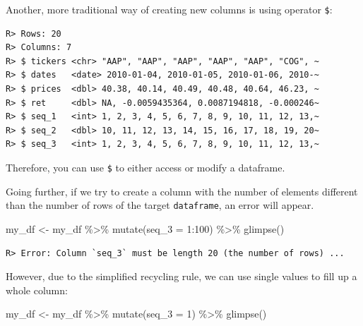 \documentclass[
  12pt,
]{book}
\newenvironment{Shaded}{\begin{snugshade}}{\end{snugshade}}
\newcommand{\AttributeTok}[1]{\textcolor[rgb]{0.61,0.61,0.61}{#1}}
\newcommand{\CommentTok}[1]{\textcolor[rgb]{0.37,0.37,0.37}{\textit{#1}}}
\newcommand{\DecValTok}[1]{\textcolor[rgb]{0.06,0.06,0.06}{#1}}
\newcommand{\FunctionTok}[1]{\textcolor[rgb]{0,0,0}{#1}}
\newcommand{\NormalTok}[1]{#1}
\newcommand{\OtherTok}[1]{\textcolor[rgb]{0.37,0.37,0.37}{#1}}
\newcommand{\SpecialCharTok}[1]{\textcolor[rgb]{0,0,0}{#1}}
\begin{document}
Another, more traditional way of creating new columns is using operator \texttt{\$}:

\begin{Shaded}
\end{Shaded}

\begin{verbatim}
R> Rows: 20
R> Columns: 7
R> $ tickers <chr> "AAP", "AAP", "AAP", "AAP", "AAP", "COG", ~
R> $ dates   <date> 2010-01-04, 2010-01-05, 2010-01-06, 2010-~
R> $ prices  <dbl> 40.38, 40.14, 40.49, 40.48, 40.64, 46.23, ~
R> $ ret     <dbl> NA, -0.0059435364, 0.0087194818, -0.000246~
R> $ seq_1   <int> 1, 2, 3, 4, 5, 6, 7, 8, 9, 10, 11, 12, 13,~
R> $ seq_2   <dbl> 10, 11, 12, 13, 14, 15, 16, 17, 18, 19, 20~
R> $ seq_3   <int> 1, 2, 3, 4, 5, 6, 7, 8, 9, 10, 11, 12, 13,~
\end{verbatim}

Therefore, you can use \texttt{\$} to either access or modify a dataframe.

Going further, if we try to create a column with the number of elements different than the number of rows of the target \texttt{dataframe}, an error will appear.

\begin{Shaded}
\begin{Highlighting}[]
\NormalTok{my\_df }\OtherTok{\textless{}{-}}\NormalTok{ my\_df }\SpecialCharTok{\%\textgreater{}\%}
  \FunctionTok{mutate}\NormalTok{(}\AttributeTok{seq\_3 =}  \DecValTok{1}\SpecialCharTok{:}\DecValTok{100}\NormalTok{) }\SpecialCharTok{\%\textgreater{}\%}
  \FunctionTok{glimpse}\NormalTok{()}
\end{Highlighting}
\end{Shaded}

\begin{verbatim}
R> Error: Column `seq_3` must be length 20 (the number of rows) ...
\end{verbatim}

However, due to the simplified recycling rule, we can use single values to fill up a whole column:

\begin{Shaded}
\begin{Highlighting}[]
\NormalTok{my\_df }\OtherTok{\textless{}{-}}\NormalTok{ my\_df }\SpecialCharTok{\%\textgreater{}\%}
  \FunctionTok{mutate}\NormalTok{(}\AttributeTok{seq\_3 =}  \DecValTok{1}\NormalTok{) }\SpecialCharTok{\%\textgreater{}\%}
  \FunctionTok{glimpse}\NormalTok{()}
\end{Highlighting}
\end{Shaded}
\end{document}
